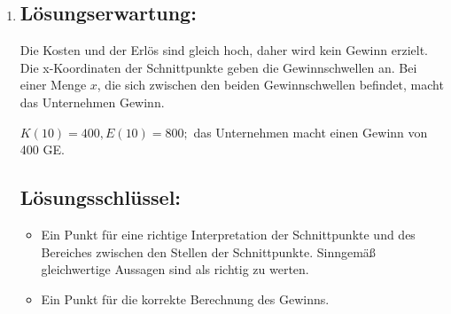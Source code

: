 \begin{langesbeispiel}
{\begin{enumerate}
		$E(x)=80\cdot x$
		
		
	\subsection{Lösungsschlüssel:}
	
\begin{itemize}
	\item Ein Punkt für die korrekte Angabe des Verkaufspreises.
	\item Ein Punkt, wenn $E(x)$ richtig angegeben ist.
\end{itemize}

\item \subsection{Lösungserwartung:} 
	
	Die Kosten und der Erlös sind gleich hoch, daher wird kein Gewinn erzielt. Die x-Koordinaten der Schnittpunkte geben die Gewinnschwellen an. Bei einer Menge $x$, die sich zwischen den beiden Gewinnschwellen befindet, macht das Unternehmen Gewinn.
	
	$K(10)=400, E(10)=800;$ das Unternehmen macht einen Gewinn von 400 GE.
	 	
	\subsection{Lösungsschlüssel:}
	\begin{itemize}
		\item Ein Punkt für eine richtige Interpretation der Schnittpunkte und des Bereiches zwischen den Stellen der Schnittpunkte. Sinngemäß gleichwertige Aussagen sind als richtig zu werten.
		\item  Ein Punkt für die korrekte Berechnung des Gewinns.
	\end{itemize}

\end{enumerate}}
		\end{langesbeispiel}